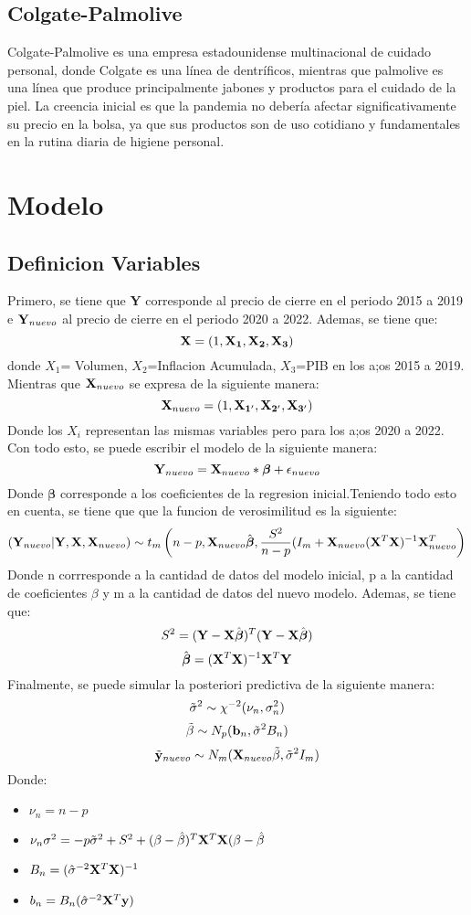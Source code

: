 \documentclass{article}
\begin{document}
\subsection{Colgate-Palmolive} Colgate-Palmolive es una empresa estadounidense multinacional de cuidado personal, donde Colgate es una línea de dentríficos, mientras que palmolive es una línea que produce principalmente jabones y productos para el cuidado de la piel. La creencia inicial es que la pandemia no debería afectar significativamente su precio en la bolsa, ya que sus productos son de uso cotidiano y fundamentales en la rutina diaria de higiene personal.
\section{Modelo} 
\subsection{Definicion Variables} Primero, se tiene que {\bf Y} corresponde al precio de cierre en el periodo 2015 a 2019 e ${\bf Y}_{nuevo}$ al precio de  cierre en el periodo 2020 a 2022. Ademas, se tiene que:
\[
{\bf X} = (1,{\bf X_1},{\bf X_2},{\bf X_3})
\]
donde $X_1$= Volumen, $X_2$=Inflacion Acumulada, $X_3$=PIB en los a;os 2015 a 2019. Mientras que ${\bf X}_{nuevo}$ se expresa de la siguiente manera:
\[
{\bf X}_{nuevo} = (1,{\bf X_{1'}},{\bf X_{2'}},{\bf X_{3'}})
\]
Donde los $X_i$ representan las mismas variables pero para los a;os 2020 a 2022. \\
Con todo esto, se puede escribir el modelo de la siguiente manera:
\[
 {\bf Y}_{nuevo}={\bf X}_{nuevo}*\boldsymbol{\beta}+\epsilon_{nuevo}
\]
Donde $\boldsymbol{\beta}$ corresponde a los coeficientes de la regresion inicial.Teniendo todo esto en cuenta, se tiene que que la funcion de verosimilitud es la siguiente:
\[
({\bf Y}_{nuevo}|{\bf Y},{\bf X},{\bf X}_{nuevo})\sim t_m\left(n-p,{\bf X}_{nuevo}\hat{{\boldsymbol \beta}},\frac{S^2}{n-p}(I_m+{\bf X}_{nuevo}({\bf X}^T{\bf X})^{-1}{\bf X}_{nuevo}^T\right)
\]
Donde n corrresponde a la cantidad de datos del modelo inicial, p a la cantidad de coeficientes $\beta$ y m a la cantidad de datos del nuevo modelo. Ademas, se tiene que:
\[
S^2 = ({\bf Y}-{\bf X}\hat{\boldsymbol \beta})^T({\bf Y}-{\bf X}\hat{\boldsymbol \beta})
\]
\[
\hat{\boldsymbol \beta} = ({\bf X}^T{\bf X})^{-1}{\bf X}^T{\bf Y}
\]
Finalmente, se puede simular la posteriori predictiva de la siguiente manera: 
\[
\Tilde{\sigma}^2 \sim \chi^{-2}(\nu_n,\sigma^2_n)
\]
\[
\Tilde{\beta} \sim N_p({\bf b}_n, \Tilde{\sigma}^2B_n)
\]
\[
\Tilde{{\bf y}}_{nuevo} \sim N_m({\bf X}_{nuevo}\Tilde{\beta},\Tilde{\sigma}^2I_m)
\]
Donde:
\begin{itemize}
\item $\nu_n = n-p$
\item $\nu_n\sigma^2 = -p\Tilde{\sigma}^2+S^2+(\beta-\hat{\beta})^T{\bf X}^T{\bf X}(\beta - \hat{\beta}$
    \item $B_n = (\hat{\sigma}^{-2}{\bf X}^T{\bf X})^{-1}$
    \item $b_n = B_n(\hat{\sigma}^{-2}{\bf X}^T{\bf y})$

\end{itemize}
\end{document}

